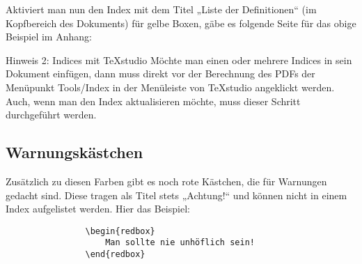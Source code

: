 				Aktiviert man nun den Index mit dem Titel „Liste der Definitionen“ (im Kopfbereich des Dokuments) für gelbe Boxen, gäbe es folgende Seite für das obige Beispiel im Anhang:

				\begin{center}
				\end{center}

					\begin{yellowboxIdx}{Hinweis 2: Indices mit TeXstudio}
						Möchte man einen oder mehrere Indices in sein Dokument einfügen, dann muss direkt vor der Berechnung des PDFs der Menüpunkt Tools/Index in der Menüleiste von TeXstudio angeklickt werden. Auch, wenn man den Index aktualisieren möchte, muss dieser Schritt durchgeführt werden.
					\end{yellowboxIdx}

			\subsection{Warnungskästchen}

				Zusätzlich zu diesen Farben gibt es noch rote Kästchen, die für Warnungen gedacht sind. Diese tragen als Titel stets „Achtung!“ und können nicht in einem Index aufgelistet werden. Hier das Beispiel:

				\begin{verbatim}
				\begin{redbox}
					Man sollte nie unhöflich sein!
				\end{redbox}
				\end{verbatim}

				\newline



















